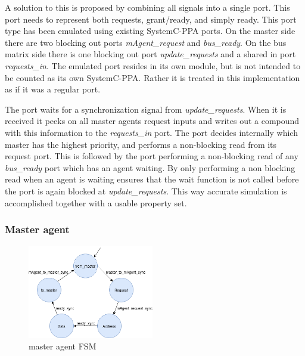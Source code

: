 A solution to this is proposed by combining all signals into a single port. This port needs to represent both requests, grant/ready, and simply ready.
This port type has been emulated using existing SystemC-PPA ports. On the master side there are two blocking out ports \textit{mAgent\_request} and \textit{bus\_ready}. On the bus matrix side there is one blocking out port \textit{update\_requests} and a shared in port \textit{requests\_in}. The emulated
port resides in its own module, but is not intended to be counted as its own SystemC-PPA. Rather it is treated in this implementation as if it was a regular
port. \par
The port waits for a synchronization signal from \textit{update\_requests}. When it is received it peeks on all master agents request inputs and writes out a compound with this information to the \textit{requests\_in} port. The port decides internally which master has the highest priority, and performs a non-blocking read from its request port. This is followed by the port performing a non-blocking read of any \textit{bus\_ready} port which has an agent waiting. 
By only performing a non blocking read when an agent is waiting ensures that the wait function is not called before the port is again blocked at \textit{update\_requests}. This way accurate simulation is accomplished together with a usable property set. \par

\subsubsection{Master agent}
\begin{figure}
\includegraphics[width=5.5cm]{figs/ESL/mAgent_ESL.png}
\caption{master agent FSM}\label{fig:eafsm}
\end{figure}

